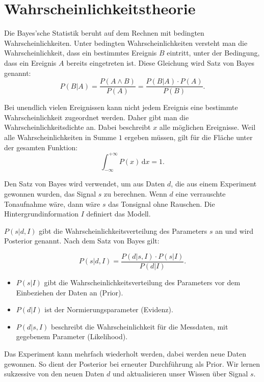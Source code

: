 \section{Wahrscheinlichkeitstheorie}\label{k4.2.bayes}

Die Bayes'sche Statistik beruht auf dem Rechnen mit bedingten Wahrscheinlichkeiten. Unter bedingten Wahrscheinlichkeiten versteht man die Wahrscheinlichkeit, dass ein bestimmtes Ereignis $B$ eintritt, unter der Bedingung, dass ein Ereignis $A$ bereits eingetreten ist. Diese Gleichung wird Satz von Bayes genannt:
\begin{equation}
P(B|A) = \frac{P(A \wedge B)}{P(A)} = \frac{P(B|A)\cdot P(A)}{P(B)}.
\end{equation}

Bei unendlich vielen Ereignissen kann nicht jedem Ereignis eine bestimmte Wahrscheinlichkeit zugeordnet werden. Daher gibt man die Wahrscheinlichkeitsdichte an. Dabei beschreibt $x$ alle möglichen Ereignisse. Weil alle Wahrscheinlichkeiten in Summe $1$ ergeben müssen, gilt für die Fläche unter der gesamten Funktion:
\begin{equation}
\int_{- \infty }^ {+ \infty} P(x) \,\mbox{d}x = 1.
\end{equation}

Den Satz von Bayes wird verwendet, um aus Daten $d$, die aus einem Experiment gewonnen wurden, das Signal $s$ zu berechnen. Wenn $d$ eine verrauschte Tonaufnahme wäre, dann wäre $s$ das Tonsignal ohne Rauschen. Die Hintergrundinformation $I$ definiert das Modell. 


 
 $P(s|d,I)$ gibt die Wahrscheinlichkeitsverteilung des Parameters $s$ an und wird Posterior genannt. Nach dem Satz von Bayes gilt:
 
\begin{equation}
P(s|d,I) = \frac{P(d|s,I)\cdot P(s|I)}{P(d|I)}.
\end{equation}

\begin{itemize}
 \item $P(s|I)$ gibt die Wahrscheinlichkeitsverteilung des Parameters vor dem Einbeziehen der Daten an (Prior).
 \item $P(d|I)$ ist der Normierungsparameter (Evidenz).
 \item $P(d|s,I)$ beschreibt die Wahrscheinlichkeit für die Messdaten, mit gegebenem Parameter (Likelihood).
\end{itemize}

Das Experiment kann mehrfach wiederholt werden, dabei werden neue Daten gewonnen. So dient der Posterior bei erneuter Durchführung als Prior. Wir lernen sukzessive von  den neuen Daten $d$ und aktualisieren unser Wissen über Signal $s$.